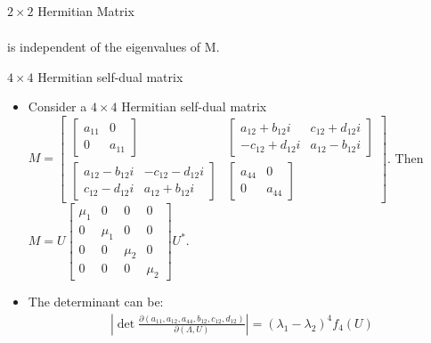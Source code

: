 \documentclass[UTF8,AutoFakeBold,AutoFakeSlant]{beamer}
\begin{document}
\begin{frame}{$2\times 2$ Hermitian Matrix}
\begin{itemize}
\begin{align*}
              \end{align*}
              is independent of the eigenvalues of M.
    \end{itemize}
\end{frame}

\begin{frame}{$4 \times 4$ Hermitian self-dual matrix}
    \begin{itemize}
        \scriptsize
        \item Consider a $4\times 4$ Hermitian self-dual matrix
              $M=\begin{bmatrix}
                      \begin{bmatrix}a_{11}&0\\0&a_{11}\end{bmatrix}                                            & \begin{bmatrix}a_{12}+b_{12}i&c_{12}+d_{12}i\\-c_{12}+d_{12}i&a_{12}-b_{12}i\end{bmatrix} \\
                      \begin{bmatrix}a_{12}-b_{12}i&-c_{12}-d_{12}i\\c_{12}-d_{12}i&a_{12}+b_{12}i\end{bmatrix} & \begin{bmatrix}a_{44}&0\\0&a_{44}\end{bmatrix}
                  \end{bmatrix}$. Then $M=U\begin{bmatrix}\mu_1&0&0&0\\0&\mu_1&0&0\\0&0&\mu_2&0\\0&0&0&\mu_2\end{bmatrix}U^*$.
        \item The determinant can be:
              \begin{align*}
                  \left|\det\frac{\partial(a_{11},a_{12},a_{44},b_{12},c_{12},d_{12})}{\partial(\Lambda, U)}\right|=\left(\lambda_1-\lambda_2\right)^4f_4(U)
              \end{align*}
    \end{itemize}
\end{frame}
\end{document}
